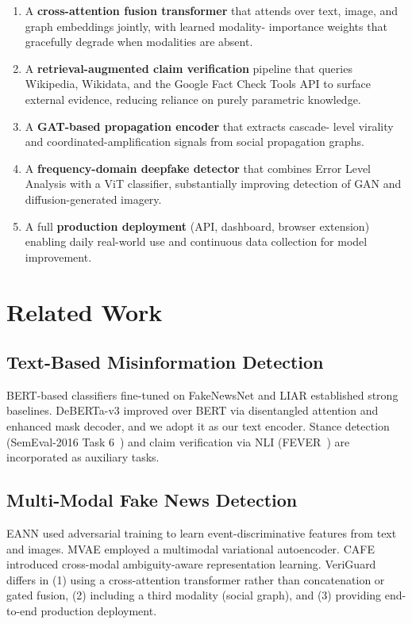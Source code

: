 \documentclass[11pt,a4paper]{article}
\begin{document}
\begin{enumerate}
  \item A \textbf{cross-attention fusion transformer} that attends over
    text, image, and graph embeddings jointly, with learned modality-
    importance weights that gracefully degrade when modalities are absent.

  \item A \textbf{retrieval-augmented claim verification} pipeline that
    queries Wikipedia, Wikidata, and the Google Fact Check Tools API to
    surface external evidence, reducing reliance on purely parametric
    knowledge.

  \item A \textbf{GAT-based propagation encoder} that extracts cascade-
    level virality and coordinated-amplification signals from social
    propagation graphs.

  \item A \textbf{frequency-domain deepfake detector} that combines Error
    Level Analysis with a ViT classifier, substantially improving
    detection of GAN and diffusion-generated imagery.

  \item A full \textbf{production deployment} (API, dashboard, browser
    extension) enabling daily real-world use and continuous data
    collection for model improvement.
\end{enumerate}

\section{Related Work}
\label{sec:related}

\subsection{Text-Based Misinformation Detection}
BERT-based classifiers fine-tuned on FakeNewsNet and LIAR
\cite{devlin2019bert} established strong baselines. DeBERTa-v3
\cite{he2021deberta} improved over BERT via disentangled attention and
enhanced mask decoder, and we adopt it as our text encoder. Stance
detection (SemEval-2016 Task 6~\cite{semeval2016}) and claim verification
via NLI (FEVER~\cite{thorne2018fever}) are incorporated as auxiliary tasks.

\subsection{Multi-Modal Fake News Detection}
EANN \cite{wang2018eann} used adversarial training to learn
event-discriminative features from text and images. MVAE
\cite{khattar2019mvae} employed a multimodal variational autoencoder.
CAFE \cite{chen2022cafe} introduced cross-modal ambiguity-aware
representation learning. VeriGuard differs in (1) using a cross-attention
transformer rather than concatenation or gated fusion, (2) including a
third modality (social graph), and (3) providing end-to-end
production deployment.
\end{document}
